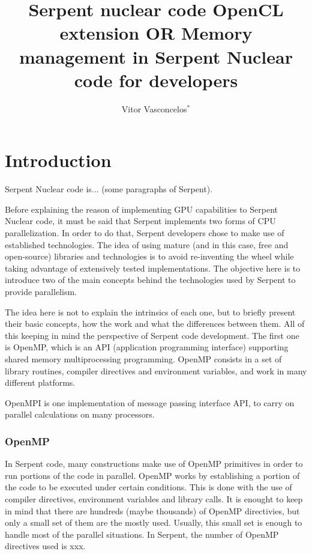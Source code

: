 \documentclass[twoside,a4paper,12pt,english]{anstrans}
\title{Serpent nuclear code OpenCL extension OR Memory management in Serpent Nuclear code
for developers}
\author{Vitor Vasconcelos$^{*}$}
\institute{
  $^{*}$Centro de Desenvolvimento da Tecnologia Nuclear - CDTN, Comiss\~ao Nacional de Energia Nuclear - CNEN,
  Av. Presidente Ant\^onio Carlos 6627, CEP 31270-901, Belo Horizonte - MG, Brazil
}
\begin{document}
\vspace*{-42pt}
\begin{strip}
\vspace*{14pt}
\end{strip}


\section{Introduction}


Serpent Nuclear code is... (some paragraphs of Serpent).



Before explaining the reason of implementing GPU capabilities to Serpent Nuclear code,
it must be said that Serpent implements two forms of CPU parallelization. In order to
do that, Serpent developers chose to make use of established technologies. The idea of using mature
(and in this case, free and open-source) libraries and technologies is to avoid re-inventing the wheel
while taking advantage of extensively tested implementations. The objective here is to
introduce two of the main concepts behind the technologies used by Serpent to provide parallelism.

The idea here is not to explain the intrinsics of each one, but to briefly present their basic
concepts, how the work and what the differences between them. All of this keeping in mind the
perspective of Serpent code development. The first one is OpenMP\cite{Dagum1998}, which is an API
(application programming interface) supporting shared memory multiprocessing programming. OpenMP consists
in a set of library routines, compiler directives and environment variables, and work in many different platforms.

OpenMPI\cite{openmpi2004} is one implementation of message passing interface API, to carry on parallel calculations on many processors.

\subsubsection{OpenMP}
In Serpent code, many constructions make use of OpenMP primitives in order to run portions of the code in parallel.
OpenMP works by establishing a portion
of the code to be executed under certain conditions. This is done with the use of compiler directives,
environment variables and library calls. It is enought to keep in mind that there are hundreds (maybe thousands)
of OpenMP directivies, but only a small set of them are the mostly used. Usually, this small set is enough
to handle most of the parallel situations. In Serpent, the number of OpenMP directives used is xxx.
\end{document}
